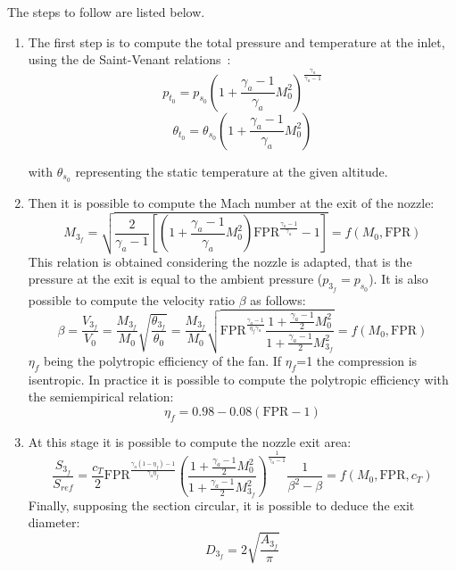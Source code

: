 The steps to follow are listed below.
\begin{enumerate}
	\item The first step is to compute the total pressure and temperature at the inlet, using the de Saint-Venant relations~\cite{bib:carlomagno}:
	\begin{equation}
		\label{eq:total_pressure_pt0}
		p_{t_{0}} = p_{s_{0}}\left(1+\frac{\gamma_a-1}{\gamma_a}M_0^2\right)^{\frac{\gamma_a}{\gamma_a-1}}
	\end{equation}
	\begin{equation}
		\label{eq:total_temperature_tt0}
		\theta_{t_{0}} = \theta_{s_{0}}\left(1+\frac{\gamma_a-1}{\gamma_a}M_0^2\right)
	\end{equation}
	
	with $\theta_{s_{0}}$ representing the static temperature at the given altitude. 
	
	\item Then it is possible to compute the Mach number at the exit of the nozzle:
	\begin{equation}
		\label{eq:mach_nozzle_m3f}
		M_{3_{f}} = \sqrt{\frac{2}{\gamma_a-1}\left[\left(1+\frac{\gamma_a-1}{\gamma_a}M_0^2\right)\mathrm{FPR}^{\frac{\gamma_a-1}{\gamma_a}}-1\right]} = f(M_0,\mathrm{FPR})
	\end{equation}
	This relation is obtained considering the nozzle is adapted, that is the pressure at the exit is equal to the ambient pressure ($p_{3_{f}}=p_{s_{0}}$). 
	It is also possible to compute the velocity ratio $\beta$ as follows:
	\begin{equation}
	\label{eq:velocity_ratio_beta}
		\beta=\frac{V_{3_{f}}}{V_0}=\frac{M_{3_{f}}}{M_0}\sqrt{\frac{\theta_{3_{f}}}{\theta_0}}=\frac{M_{3_{f}}}{M_0}\sqrt{\mathrm{FPR}^{\frac{\gamma_a-1}{\eta_f\gamma_a}}\frac{1+\frac{\gamma_a-1}{2}M_0^2}{1+\frac{\gamma_a-1}{2}M_{3_{f}}^2}}=f(M_0,\mathrm{FPR})
	\end{equation}
	$\eta_f$ being the polytropic efficiency of the fan. 
	If $\eta_f$=1 the compression is isentropic. 
	In practice it is possible to compute the polytropic efficiency with the semiempirical relation: 
	\begin{equation}
		\label{eq:fan_eff_etaf}
		\eta_f=\num{0.98}-\num{0.08}\left(\mathrm{FPR}-1\right)
	\end{equation} 
	
	\item At this stage it is possible to compute the nozzle exit area:
	\begin{equation}
		\label{eq:s3f_ratio_fan}
		\frac{S_{3_{f}}}{S_{ref}}=\frac{c_T}{2}\mathrm{FPR}^{\frac{\gamma_a(1-\eta_f)-1}{\gamma_a\eta_f}}\left(\frac{1+\frac{\gamma_a-1}{2}M_0^2}{1+\frac{\gamma_a-1}{2}M_{3_{f}}^2}\right)^{\frac{1}{\gamma_a-1}}\frac{1}{\beta^2-\beta}=f(M_0,\mathrm{FPR},c_T)
	\end{equation}
	Finally, supposing the section circular, it is possible to deduce the exit diameter:
	\begin{equation}
		\label{eq:fan_exit_diameter}
		D_{3_{f}} = 2\sqrt{\frac{A_{3_{f}}}{\pi}}
	\end{equation}
	

\end{enumerate}
